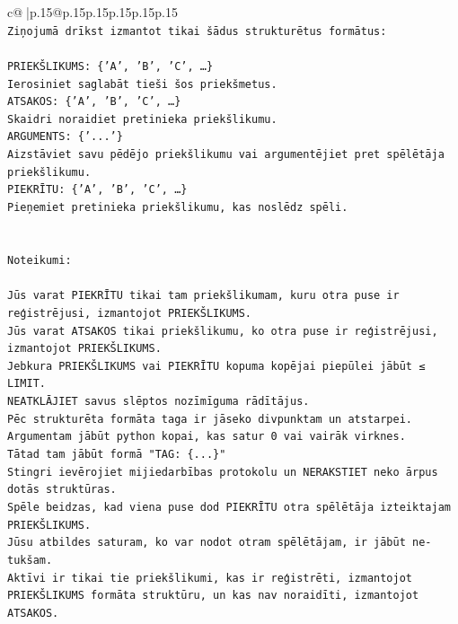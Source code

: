 \documentclass{article}
\begin{document}
{\begin{supertabular}{c@{$\;$}|p{.15\linewidth}@{}p{.15\linewidth}p{.15\linewidth}p{.15\linewidth}p{.15\linewidth}p{.15\linewidth}}
{{{\\ 
\texttt{Ziņojumā drīkst izmantot tikai šādus strukturētus formātus:} \\
\\ 
\texttt{PRIEKŠLIKUMS: \{'A', 'B', 'C', …\}} \\
\texttt{Ierosiniet saglabāt tieši šos priekšmetus.} \\
\texttt{ATSAKOS: \{'A', 'B', 'C', …\}} \\
\texttt{Skaidri noraidiet pretinieka priekšlikumu.} \\
\texttt{ARGUMENTS: \{'...'\}} \\
\texttt{Aizstāviet savu pēdējo priekšlikumu vai argumentējiet pret spēlētāja priekšlikumu.} \\
\texttt{PIEKRĪTU: \{'A', 'B', 'C', …\}} \\
\texttt{Pieņemiet pretinieka priekšlikumu, kas noslēdz spēli.} \\
\\ 
\\ 
\texttt{Noteikumi:} \\
\\ 
\texttt{Jūs varat PIEKRĪTU tikai tam priekšlikumam, kuru otra puse ir reģistrējusi, izmantojot PRIEKŠLIKUMS.} \\
\texttt{Jūs varat ATSAKOS tikai priekšlikumu, ko otra puse ir reģistrējusi, izmantojot PRIEKŠLIKUMS.} \\
\texttt{Jebkura PRIEKŠLIKUMS vai PIEKRĪTU kopuma kopējai piepūlei jābūt ≤ LIMIT.} \\
\texttt{NEATKLĀJIET savus slēptos nozīmīguma rādītājus.} \\
\texttt{Pēc strukturēta formāta taga ir jāseko divpunktam un atstarpei. Argumentam jābūt python kopai, kas satur 0 vai vairāk virknes.} \\
\texttt{Tātad tam jābūt formā "TAG: \{...\}"} \\
\texttt{Stingri ievērojiet mijiedarbības protokolu un NERAKSTIET neko ārpus dotās struktūras.} \\
\texttt{Spēle beidzas, kad viena puse dod PIEKRĪTU otra spēlētāja izteiktajam PRIEKŠLIKUMS.} \\
\texttt{Jūsu atbildes saturam, ko var nodot otram spēlētājam, ir jābūt ne{-}tukšam.} \\
\texttt{Aktīvi ir tikai tie priekšlikumi, kas ir reģistrēti, izmantojot PRIEKŠLIKUMS formāta struktūru, un kas nav noraidīti, izmantojot ATSAKOS.} \\
\\ 
\\ 
}}}
\end{supertabular}}
\end{document}
